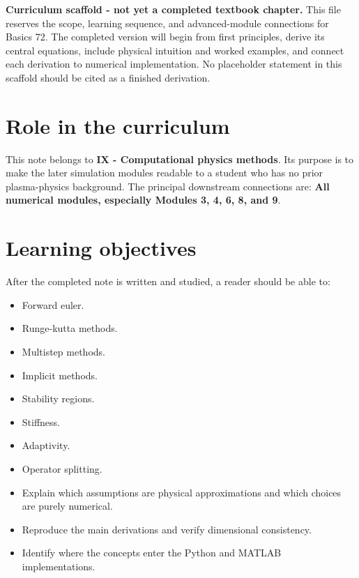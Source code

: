 \documentclass[11pt]{article}
\begin{document}

\begin{overviewbox}
\textbf{Curriculum scaffold - not yet a completed textbook chapter.} This file reserves the scope, learning sequence, and advanced-module connections for Basics 72. The completed version will begin from first principles, derive its central equations, include physical intuition and worked examples, and connect each derivation to numerical implementation. No placeholder statement in this scaffold should be cited as a finished derivation.
\end{overviewbox}

\ProjectTOC

\section{Role in the curriculum}
This note belongs to \textbf{IX - Computational physics methods}. Its purpose is to make the later simulation modules readable to a student who has no prior plasma-physics background. The principal downstream connections are: \textbf{All numerical modules, especially Modules 3, 4, 6, 8, and 9}.

\section{Learning objectives}
After the completed note is written and studied, a reader should be able to:
\begin{itemize}[leftmargin=1.6em]
\item Forward euler.
\item Runge-kutta methods.
\item Multistep methods.
\item Implicit methods.
\item Stability regions.
\item Stiffness.
\item Adaptivity.
\item Operator splitting.
\item Explain which assumptions are physical approximations and which choices are purely numerical.
\item Reproduce the main derivations and verify dimensional consistency.
\item Identify where the concepts enter the Python and MATLAB implementations.
\end{itemize}
\end{document}
